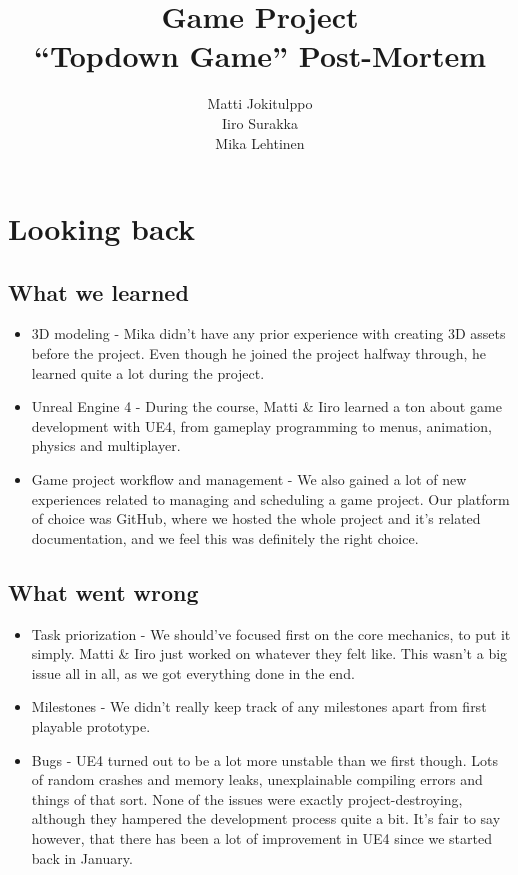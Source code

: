 \documentclass[
  oneside,
  11pt, a4paper,
  footinclude=true,
  headinclude=true,
  cleardoublepage=empty
]{scrbook}
\title{Game Project \\ ``Topdown Game'' Post-Mortem}
\author{Matti Jokitulppo \\ Iiro Surakka \\ Mika Lehtinen}
\begin{document}
\maketitle



\chapter{Looking back}
\section{What we learned}
\begin{itemize}
\item 3D modeling - Mika didn't have any prior experience with creating 3D assets before the project. Even though he joined the project halfway through, he learned quite a lot during the project.
\item Unreal Engine 4 - During the course, Matti \& Iiro learned a ton about game development with UE4, from gameplay programming to menus, animation, physics and multiplayer.
\item Game project workflow and management - We also gained a lot of new experiences related to managing and scheduling a game project. Our platform of choice was GitHub, where we hosted the whole project and it's related documentation, and we feel this was definitely the right choice.
\end{itemize}

\section{What went wrong}
\begin{itemize}
\item Task priorization - We should've focused first on the core mechanics, to put it simply. Matti \& Iiro just worked on whatever they felt like. This wasn't a big issue all in all, as we got everything done in the end.
\item Milestones - We didn't really keep track of any milestones apart from first playable prototype.
\item Bugs - UE4 turned out to be a lot more unstable than we first though. Lots of random crashes and memory leaks, unexplainable compiling errors and things of that sort. None of the issues were exactly project-destroying, although they hampered the development process quite a bit. It's fair to say however, that there has been a lot of improvement in UE4 since we started back in January.
\end{itemize}
\end{document}
